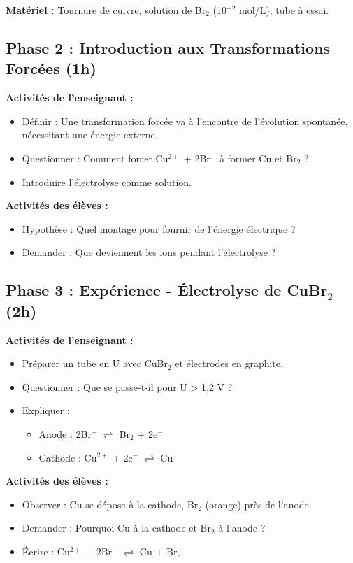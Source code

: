 \documentclass[12pt]{article}
\begin{document}
\textbf{Matériel :} Tournure de cuivre, solution de Br\(_{2}\) (10\(^{-2}\) mol/L), tube à essai.

\subsection{Phase 2 : Introduction aux Transformations Forcées (1h)}
\textbf{Activités de l’enseignant :}
\begin{itemize}
    \item Définir :  Une transformation forcée va à l’encontre de l’évolution spontanée, nécessitant une énergie externe. 
    \item Questionner : Comment forcer Cu\(^{2+}\) + 2Br\(^-\) à former Cu et Br\(_{2}\) ?
    \item Introduire l’électrolyse comme solution.
\end{itemize}

\textbf{Activités des élèves :}
\begin{itemize}
    \item Hypothèse :  Quel montage pour fournir de l’énergie électrique ?
    \item Demander : Que deviennent les ions pendant l’électrolyse ?
\end{itemize}

\subsection{Phase 3 : Expérience - Électrolyse de CuBr\(_{2}\) (2h)}
\textbf{Activités de l’enseignant :}
\begin{itemize}
    \item Préparer un tube en U avec CuBr\(_{2}\) et électrodes en graphite.
    \item Questionner :  Que se passe-t-il pour U > 1,2 V ? 
    \item Expliquer :
    \begin{itemize}
        \item Anode : 2Br\(^-\) \(\rightleftharpoons\) Br\(_{2}\) + 2e\(^-\)
        \item Cathode : Cu\(^{2+}\) + 2e\(^-\) \(\rightleftharpoons\) Cu
    \end{itemize}
\end{itemize}

\textbf{Activités des élèves :}
\begin{itemize}
    \item Observer : Cu se dépose à la cathode, Br\(_{2}\) (orange) près de l’anode.
    \item Demander :  Pourquoi Cu à la cathode et Br\(_{2}\) à l’anode ?
    \item Écrire : Cu\(^{2+}\) + 2Br\(^-\) \(\rightleftharpoons\) Cu + Br\(_{2}\).
\end{itemize}
\end{document}

